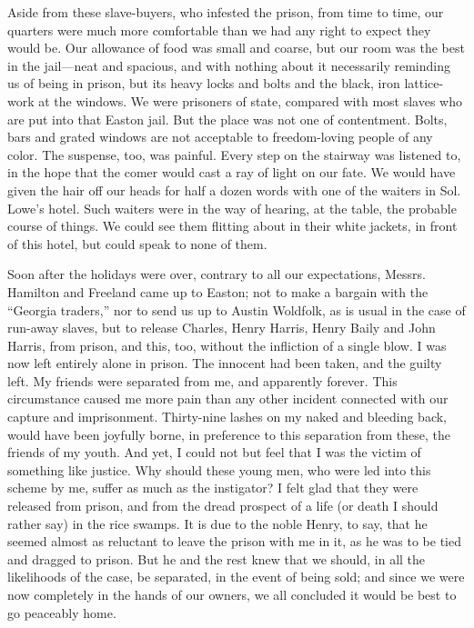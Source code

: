 Aside from these slave-buyers, who infested the {}prison, from time to
time, our quarters were much more comfortable than we had any right to
expect they would be. Our allowance of food was small and coarse, but
our room was the best in the jail---neat and spacious, and with nothing
about it necessarily reminding us of being in prison, but its heavy
locks and bolts and the black, iron lattice-work at the windows. We were
prisoners of state, compared with most slaves who are put into that
Easton jail. But the place was not one of contentment. Bolts, bars and
grated windows are not acceptable to freedom-loving people of any color.
The suspense, too, was painful. Every step on the stairway was listened
to, in the hope that the comer would cast a ray of light on our fate. We
would have given the hair off our heads for half a dozen words with one
of the waiters in Sol. Lowe's hotel. Such waiters were in the way of
hearing, at the table, the probable course of things. We could see them
flitting about in their white jackets, in front of this hotel, but could
speak to none of them.

Soon after the holidays were over, contrary to all our expectations,
Messrs. Hamilton and Freeland came up to Easton; not to make a bargain
with the ``Georgia traders,'' nor to send us up to Austin Woldfolk, as
is usual in the case of run-away slaves, but to release Charles, Henry
Harris, Henry Baily and John Harris, from prison, and this, too, without
the infliction of a single blow. I was now left entirely alone in
prison. The innocent had been taken, and the guilty left. My friends
were separated from me, and apparently forever. This circumstance caused
me {}more pain than any other incident connected with our capture and
imprisonment. Thirty-nine lashes on my naked and bleeding back, would
have been joyfully borne, in preference to this separation from these,
the friends of my youth. And yet, I could not but feel that I was the
victim of something like justice. Why should these young men, who were
led into this scheme by me, suffer as much as the instigator? I felt
glad that they were released from prison, and from the dread prospect of
a life (or death I should rather say) in the rice swamps. It is due to
the noble Henry, to say, that he seemed almost as reluctant to leave the
prison with me in it, as he was to be tied and dragged to prison. But he
and the rest knew that we should, in all the likelihoods of the case, be
separated, in the event of being sold; and since we were now completely
in the hands of our owners, we all concluded it would be best to go
peaceably home.

